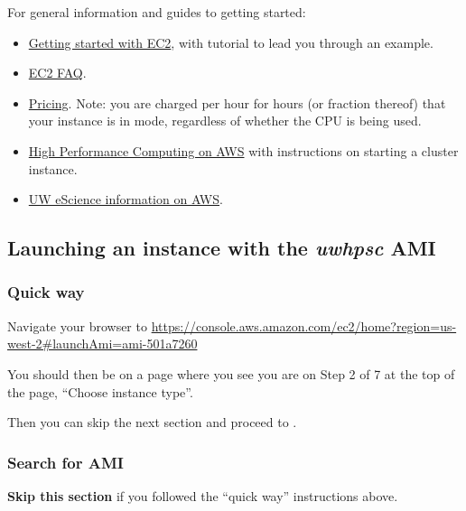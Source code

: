 \documentclass[letterpaper,10pt,english]{sphinxmanual}
\begin{document}
For general information and guides to getting started:
\begin{itemize}
\item {} 
\href{http://docs.amazonwebservices.com/AWSEC2/latest/GettingStartedGuide/}{Getting started with EC2},
with tutorial to lead you through an example.

\item {} 
\href{http://aws.amazon.com/ec2/faqs}{EC2 FAQ}.

\item {} 
\href{http://aws.amazon.com/ec2/pricing}{Pricing}.  Note: you are charged
per hour for hours (or fraction thereof) that your instance is in
 mode, regardless of whether the CPU is being used.

\item {} 
\href{http://aws.amazon.com/hpc-applications/}{High Performance Computing on AWS}
with instructions on starting a cluster instance.

\item {} 
\href{http://escience.washington.edu/get-help-now/get-started-amazon-web-services}{UW eScience information on AWS}.

\end{itemize}


\subsection{Launching an instance with the \emph{uwhpsc} AMI}
\label{aws:launching-an-instance-with-the-uwhpsc-ami}

\subsubsection{Quick way}
\label{aws:quick-way}
Navigate your browser to
\url{https://console.aws.amazon.com/ec2/home?region=us-west-2\#launchAmi=ami-501a7260}

You should then be on a page where you see you are on Step 2 of 7 at the top
of the page, ``Choose instance type''.

Then you can skip the next section and proceed to {\hyperref[aws:aws\string-instance\string-type]{}}.


\subsubsection{Search for AMI}
\label{aws:search-for-ami}
\textbf{Skip this section} if you followed the ``quick way'' instructions above.
\end{document}
